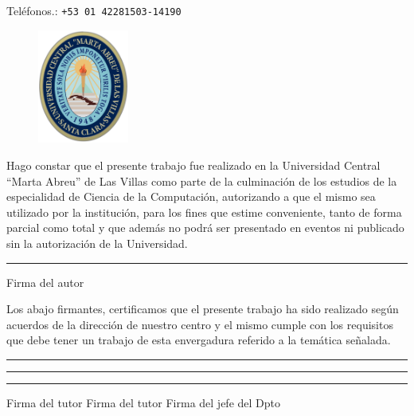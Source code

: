 \documentclass[12pt]{article}
\begin{document}
\noindent Teléfonos.: \texttt{+53 01 42281503-14190}

\newpage

\vspace*{4cm}

\begin{figure}[H]
    \centering
    \includegraphics[width=3cm]{imag/logo.png}
\end{figure}

Hago constar que el presente trabajo fue realizado en la Universidad Central “Marta Abreu” de Las Villas como parte de la culminación de los estudios de la especialidad de Ciencia de la Computación, autorizando a que el mismo sea utilizado por la institución, para los fines que estime conveniente, tanto de forma parcial como total y que además no podrá ser presentado en eventos ni publicado sin la autorización de la Universidad.

\vspace{1cm}

\begin{center}
    \rule{4cm}{0.15mm}
    
    Firma del autor
\end{center}

Los abajo firmantes, certificamos que el presente trabajo ha sido realizado según acuerdos de la dirección de nuestro centro y el mismo cumple con los requisitos que debe tener un trabajo de esta envergadura referido a la temática señalada.

\vspace{1cm}

\begin{center}
    \rule{3cm}{0.15mm} \hspace{0.7cm} \rule{3cm}{0.15mm} \hspace{0.9cm} \rule{4.5cm}{0.15mm}
    
    Firma del tutor \hspace{0.8cm} Firma del tutor \hspace{1.2cm}  Firma del jefe del Dpto
\end{center}
\end{document}
